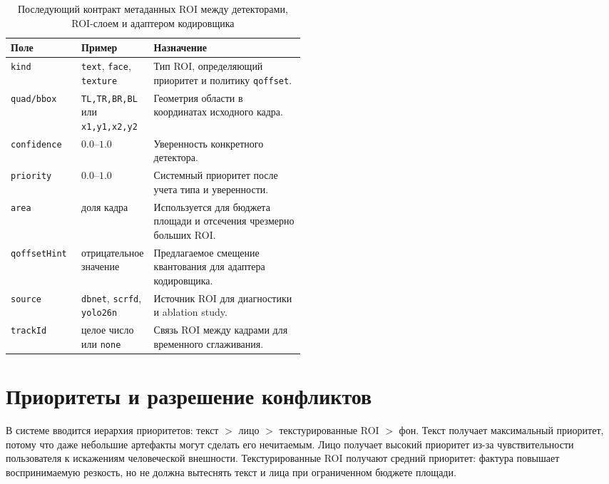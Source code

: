 \documentclass[12pt,a4paper,oneside,openany]{report}
\begin{document}
\begin{table}[H]\centering\caption{Последующий контракт метаданных ROI между детекторами, ROI-слоем и адаптером кодировщика}\label{tab:richroi_contract}\small\begin{tabularx}{\linewidth}{@{}P{0.24\linewidth}P{0.24\linewidth}Y@{}}\toprule
Поле & Пример & Назначение \\
\midrule
\texttt{kind} & \texttt{text}, \texttt{face}, \texttt{texture} & Тип ROI, определяющий приоритет и политику \texttt{qoffset}. \\
\texttt{quad/bbox} & \texttt{TL,TR,BR,BL} или \texttt{x1,y1,x2,y2} & Геометрия области в координатах исходного кадра. \\
\texttt{confidence} & $0.0$--$1.0$ & Уверенность конкретного детектора. \\
\texttt{priority} & $0.0$--$1.0$ & Системный приоритет после учета типа и уверенности. \\
\texttt{area} & доля кадра & Используется для бюджета площади и отсечения чрезмерно больших ROI. \\
\texttt{qoffsetHint} & отрицательное значение & Предлагаемое смещение квантования для адаптера кодировщика. \\
\texttt{source} & \texttt{dbnet}, \texttt{scrfd}, \texttt{yolo26n} & Источник ROI для диагностики и ablation study. \\
\texttt{trackId} & целое число или \texttt{none} & Связь ROI между кадрами для временного сглаживания. \\
\bottomrule\end{tabularx}
\end{table}

\section{Приоритеты и разрешение конфликтов}

В системе вводится иерархия приоритетов: текст $>$ лицо $>$ текстурированные ROI $>$ фон. Текст получает максимальный приоритет, потому что даже небольшие артефакты могут сделать его нечитаемым. Лицо получает высокий приоритет из-за чувствительности пользователя к искажениям человеческой внешности. Текстурированные ROI получают средний приоритет: фактура повышает воспринимаемую резкость, но не должна вытеснять текст и лица при ограниченном бюджете площади.
\end{document}
